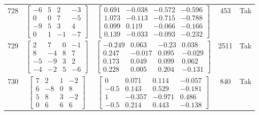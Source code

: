 \documentclass[a4paper,12pt]{article}
\begin{document}
\begin{tabular}{c c c c c}
728
&
$\begin{bmatrix} -6 & 5 & 2 & -3 \\ 0 & 0 & 7 & -5 \\ -9 & 5 & 3 & 4 \\ 0 & 1 & -1 & -7 \end{bmatrix}$
&
$\begin{bmatrix} 0.691 & -0.038 & -0.572 & -0.596 \\ 1.073 & -0.113 & -0.715 & -0.788 \\ 0.099 & 0.119 & -0.066 & -0.166 \\ 0.139 & -0.033 & -0.093 & -0.232 \end{bmatrix}$
&
453
&
Tak
\\
729
&
$\begin{bmatrix} 2 & 7 & 0 & -1 \\ 8 & -4 & 8 & 7 \\ -5 & -9 & 3 & 2 \\ -4 & -2 & 5 & -6 \end{bmatrix}$
&
$\begin{bmatrix} -0.249 & 0.063 & -0.23 & 0.038 \\ 0.247 & -0.017 & 0.095 & -0.029 \\ 0.173 & 0.049 & 0.099 & 0.062 \\ 0.228 & 0.005 & 0.204 & -0.131 \end{bmatrix}$
&
2511
&
Tak
\\
730
&
$\begin{bmatrix} 7 & 2 & 1 & -2 \\ 6 & -8 & 0 & 8 \\ 5 & 8 & 3 & -2 \\ 0 & 6 & 6 & 6 \end{bmatrix}$
&
$\begin{bmatrix} 0 & 0.071 & 0.114 & -0.057 \\ -0.5 & 0.143 & 0.529 & -0.181 \\ 1 & -0.357 & -0.971 & 0.486 \\ -0.5 & 0.214 & 0.443 & -0.138 \end{bmatrix}$
&
840
&
Tak
\\
\end{tabular} \egroup \newpage
\end{document}
